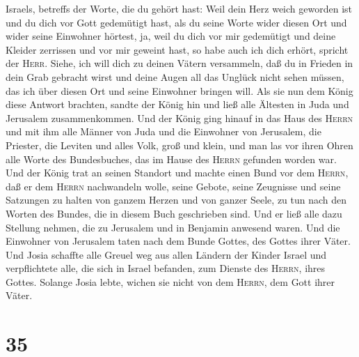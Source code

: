 Israels, betreffs der Worte, die du gehört hast:  Weil
dein Herz weich geworden ist und du dich vor Gott gedemütigt hast, als
du seine Worte wider diesen Ort und wider seine Einwohner hörtest, ja,
weil du dich vor mir gedemütigt und deine Kleider zerrissen und vor mir
geweint hast, so habe auch ich dich erhört, spricht der \textsc{Herr}.
 Siehe, ich will dich zu deinen Vätern versammeln, daß du
in Frieden in dein Grab gebracht wirst und deine Augen all das Unglück
nicht sehen müssen, das ich über diesen Ort und seine Einwohner bringen
will.  Als sie nun dem König diese Antwort brachten,
sandte der König hin und ließ alle Ältesten in Juda und Jerusalem
zusammenkommen.  Und der König ging hinauf in das Haus
des \textsc{Herrn} und mit ihm alle Männer von Juda und die Einwohner
von Jerusalem, die Priester, die Leviten und alles Volk, groß und klein,
und man las vor ihren Ohren alle Worte des Bundesbuches, das im Hause
des \textsc{Herrn} gefunden worden war.  Und der König
trat an seinen Standort und machte einen Bund vor dem \textsc{Herrn},
daß er dem \textsc{Herrn} nachwandeln wolle, seine Gebote, seine
Zeugnisse und seine Satzungen zu halten von ganzem Herzen und von ganzer
Seele, zu tun nach den Worten des Bundes, die in diesem Buch geschrieben
sind.  Und er ließ alle dazu Stellung nehmen, die zu
Jerusalem und in Benjamin anwesend waren. Und die Einwohner von
Jerusalem taten nach dem Bunde Gottes, des Gottes ihrer Väter.
 Und Josia schaffte alle Greuel weg aus allen Ländern der
Kinder Israel und verpflichtete alle, die sich in Israel befanden, zum
Dienste des \textsc{Herrn}, ihres Gottes. Solange Josia lebte, wichen
sie nicht von dem \textsc{Herrn}, dem Gott ihrer Väter.

\hypertarget{section-34}{%
\section{35}\label{section-34}}


